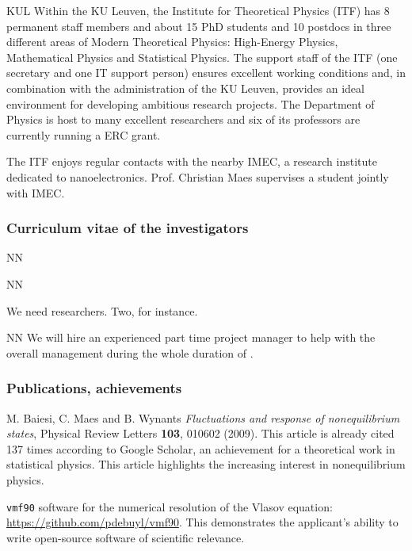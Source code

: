 \begin{sitedescription}{KUL}
Within the KU Leuven, the Institute for Theoretical Physics (ITF) has 8 permanent staff
members and about 15 PhD students and 10 postdocs in three different areas of Modern
Theoretical Physics: High-Energy Physics, Mathematical Physics and Statistical Physics.
%
The support staff of the ITF (one secretary and one IT support person) ensures excellent
working conditions and, in combination with the administration of the KU Leuven, provides an
ideal environment for developing ambitious research projects.
%
The Department of Physics is host to many excellent researchers and six of its professors
are currently running a ERC grant.

The ITF enjoys regular contacts with the nearby IMEC, a research institute dedicated to
nanoelectronics. Prof. Christian Maes supervises a student jointly with IMEC.

\subsubsection*{Curriculum vitae of the investigators}




\begin{participant}[type=res,PM=48,salary=5500]{NN}
\end{participant}
\begin{participant}[type=res,PM=36,salary=5500]{NN}

We need researchers. Two, for instance.

\end{participant}

\begin{participant}[type=res,PM=24,salary=3932]{NN}
  We will hire an experienced part time project manager to help with
  the overall management during the whole duration of \TheProject.
\end{participant}

\subsubsection*{Publications, achievements}

\begin{compactenum}
\item M. Baiesi, C. Maes and B. Wynants {\em Fluctuations and response of nonequilibrium
  states}, Physical Review Letters {\bf 103}, 010602 (2009). This article is already cited
137 times according to Google Scholar, an achievement for a theoretical work in statistical
physics. This article highlights the increasing interest in nonequilibrium physics.
\item {\tt vmf90} software for the numerical resolution of the Vlasov equation:
\url{https://github.com/pdebuyl/vmf90}. This demonstrates the applicant's ability to write
open-source software of scientific relevance.
\end{compactenum}



\end{sitedescription}
